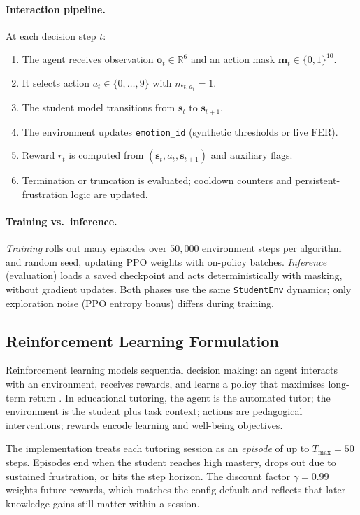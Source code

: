 \paragraph{Interaction pipeline.}
At each decision step $t$:
\begin{enumerate}
    \item The agent receives observation $\mathbf{o}_t \in \mathbb{R}^6$ and an action mask $\mathbf{m}_t \in \{0,1\}^{10}$.
    \item It selects action $a_t \in \{0,\ldots,9\}$ with $m_{t,a_t}=1$.
    \item The student model transitions from $\mathbf{s}_t$ to $\mathbf{s}_{t+1}$.
    \item The environment updates \texttt{emotion\_id} (synthetic thresholds or live FER).
    \item Reward $r_t$ is computed from $(\mathbf{s}_t, a_t, \mathbf{s}_{t+1})$ and auxiliary flags.
    \item Termination or truncation is evaluated; cooldown counters and persistent-frustration logic are updated.
\end{enumerate}

\paragraph{Training vs.\ inference.}
\emph{Training} rolls out many episodes over $50{,}000$ environment steps per algorithm and random seed, updating PPO weights with on-policy batches. \emph{Inference} (evaluation) loads a saved checkpoint and acts deterministically with masking, without gradient updates. Both phases use the same \texttt{StudentEnv} dynamics; only exploration noise (PPO entropy bonus) differs during training.

\subsection{Reinforcement Learning Formulation}\label{sec:method_rl_formulation}

Reinforcement learning models sequential decision making: an agent interacts with an environment, receives rewards, and learns a policy that maximises long-term return \cite{sutton_rl_book_2018}. In educational tutoring, the agent is the automated tutor; the environment is the student plus task context; actions are pedagogical interventions; rewards encode learning and well-being objectives.

The implementation treats each tutoring session as an \emph{episode} of up to $T_{\max}=50$ steps. Episodes end when the student reaches high mastery, drops out due to sustained frustration, or hits the step horizon. The discount factor $\gamma=0.99$ weights future rewards, which matches the config default and reflects that later knowledge gains still matter within a session.

